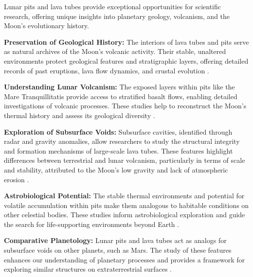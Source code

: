 Lunar pits and lava tubes provide exceptional opportunities for scientific research, offering unique insights into planetary geology, volcanism, and the Moon's evolutionary history.

\textbf{Preservation of Geological History:}  
The interiors of lava tubes and pits serve as natural archives of the Moon's volcanic activity. Their stable, unaltered environments protect geological features and stratigraphic layers, offering detailed records of past eruptions, lava flow dynamics, and crustal evolution \cite{thermal-lunar-pits, cavities-selene-lavatubes}.

\textbf{Understanding Lunar Volcanism:}  
The exposed layers within pits like the Mare Tranquillitatis provide access to stratified basalt flows, enabling detailed investigations of volcanic processes. These studies help to reconstruct the Moon’s thermal history and assess its geological diversity \cite{kerber2023, grails-gradients-mariushills}.

\textbf{Exploration of Subsurface Voids:}  
Subsurface cavities, identified through radar and gravity anomalies, allow researchers to study the structural integrity and formation mechanisms of large-scale lava tubes. These features highlight differences between terrestrial and lunar volcanism, particularly in terms of scale and stability, attributed to the Moon’s low gravity and lack of atmospheric erosion \cite{cavities-selene-lavatubes, grails-gradients-mariushills}.

\textbf{Astrobiological Potential:}  
The stable thermal environments and potential for volatile accumulation within pits make them analogous to habitable conditions on other celestial bodies. These studies inform astrobiological exploration and guide the search for life-supporting environments beyond Earth \cite{newer-thermal, sublunear-lava}.

\textbf{Comparative Planetology:}  
Lunar pits and lava tubes act as analogs for subsurface voids on other planets, such as Mars. The study of these features enhances our understanding of planetary processes and provides a framework for exploring similar structures on extraterrestrial surfaces \cite{cavities-selene-lavatubes, kerber2016}.
